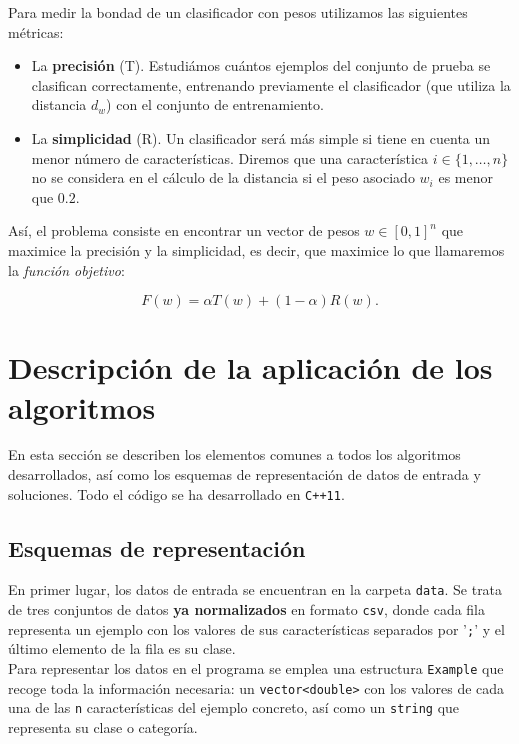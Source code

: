 \documentclass[12pt]{article}
\begin{document}
Para medir la bondad de un clasificador con pesos utilizamos las siguientes métricas:

\begin{itemize}
	\item La \textbf{precisión} (T). Estudiámos cuántos ejemplos del conjunto de prueba se clasifican correctamente, entrenando previamente el clasificador (que utiliza la distancia $d_w$) con el conjunto de entrenamiento.
	\item La \textbf{simplicidad} (R). Un clasificador será más simple si tiene en cuenta un menor número de características. Diremos que una característica $i \in \{1, \dots, n\}$ no se considera en el cálculo de la distancia si el peso asociado $w_i$ es menor que $0.2$. 
\end{itemize}

Así, el problema consiste en encontrar un vector de pesos $w \in [0,1]^n$ que maximice la precisión y la simplicidad, es decir, que maximice lo que llamaremos la \textit{función objetivo}:

\[
    F(w) = \alpha T(w) + (1 - \alpha) R(w).
\]

\newpage

\section{Descripción de la aplicación de los algoritmos}

En esta sección se describen los elementos comunes a todos los algoritmos desarrollados, así como los esquemas de representación de datos de entrada y soluciones. Todo el código se ha desarrollado en \verb|C++11|.
\subsection*{Esquemas de representación}

En primer lugar, los datos de entrada se encuentran en la carpeta \verb|data|. Se trata de tres conjuntos de datos \textbf{ya normalizados} en formato \verb|csv|, donde cada fila representa un ejemplo con los valores de sus características separados por '\verb|;|' y el último elemento de la fila es su clase.\\

Para representar los datos en el programa se emplea una estructura \verb|Example| que recoge toda la información necesaria: un \verb|vector<double>| con los valores de cada una de las \verb|n| características del ejemplo concreto, así como un \verb|string| que representa su clase o categoría.
\end{document}
